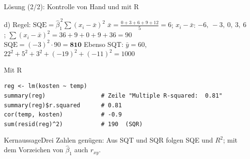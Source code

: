 \documentclass[aspectratio=169,11pt]{beamer}
\newcommand{\kernaussage}[1]{\begin{alertblock}{Kernaussage}#1\end{alertblock}}
\begin{document}
\begin{frame}[fragile]{Lösung (2/2): Kontrolle von Hand und mit R}
  \small\lstset{basicstyle=\ttfamily\footnotesize,aboveskip=2pt,belowskip=2pt}
  \begin{block}{d) Regel: $\text{SQE} = \hat{\beta}_1^{\,2} \sum (x_i - \bar{x})^{2}$}
    $\bar{x} = \frac{0+3+6+9+12}{5} = 6$; \quad $x_i - \bar{x}$: $-6,\ -3,\ 0,\ 3,\ 6$;
    \quad $\sum (x_i - \bar{x})^{2} = 36 + 9 + 0 + 9 + 36 = 90$\\[3pt]
    $\text{SQE} = (-3)^{2} \cdot 90 = \mathbf{810}$ \checkmark \qquad
    Ebenso SQT: $\bar{y} = 60$, \ $22^{2} + 5^{2} + 3^{2} + (-19)^{2} + (-11)^{2} = 1000$ \checkmark
  \end{block}

  \begin{exampleblock}{Mit R}
\begin{lstlisting}
reg <- lm(kosten ~ temp)
summary(reg)                # Zeile "Multiple R-squared:  0.81"
summary(reg)$r.squared      # 0.81
cor(temp, kosten)           # -0.9
sum(resid(reg)^2)           # 190  (SQR)
\end{lstlisting}
  \end{exampleblock}

  \kernaussage{Drei Zahlen genügen: Aus SQT und SQR folgen SQE und $R^{2}$; mit dem
    Vorzeichen von $\hat{\beta}_1$ auch $r_{xy}$.}
\end{frame}
\end{document}
